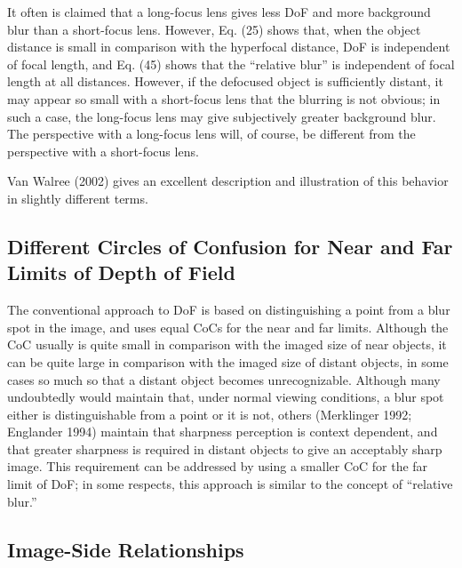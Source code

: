 \documentclass[11pt, oneside]{scrartcl}   	%
\begin{document}
It often is claimed that a long-focus lens gives less DoF and more background blur than a short-focus lens. However, Eq. (25) shows that, when the object distance is small in comparison with the hyperfocal distance, DoF is independent of focal length, and Eq. (45) shows that the “relative blur” is independent of focal length at all distances. However, if the defocused object is sufficiently distant, it may appear so small with a short-focus lens that the blurring is not obvious; in such a case, the long-focus lens may give subjectively greater background blur. The perspective with a long-focus lens will, of course, be different from the perspective with a short-focus lens.

Van Walree (2002) gives an excellent description and illustration of this behavior in slightly different terms.

\subsection{Different Circles of Confusion for Near and Far Limits of Depth of Field}

The conventional approach to DoF is based on distinguishing a point from a blur spot in the image, and uses equal CoCs for the near and far limits. Although the CoC usually is quite small in comparison with the imaged size of near objects, it can be quite large in comparison with the imaged size of distant objects, in some cases so much so that a distant object becomes unrecognizable. Although many undoubtedly would maintain that, under normal viewing conditions, a blur spot either is distinguishable from a point or it is not, others (Merklinger 1992; Englander 1994) maintain that sharpness perception is context dependent, and that greater sharpness is required in distant objects to give an acceptably sharp image. This requirement can be addressed by using a smaller CoC for the far limit of DoF; in some respects, this approach is similar to the concept of “relative blur.”

\subsection{Image-Side Relationships}
\end{document}
